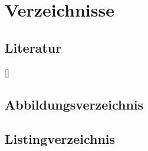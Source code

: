 \chapter{Verzeichnisse}


\section{Literatur}

[\refname]{}
\printbibliography


\section{Abbildungsverzeichnis}

\makeatletter
{} %
\makeatother


\section{Listingverzeichnis}

\begingroup
\renewcommand{\listlistingname}{}
\renewcommand{\cleardoublepage}{}
\renewcommand{\clearpage}{}
\listoflistings
\endgroup
